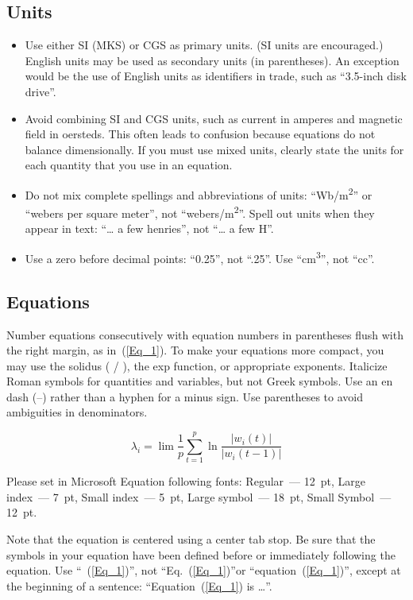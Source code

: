 \documentclass [a4paper,final,conference,10pt]{IDAACS}
\begin{document}
\subsection{Units}
\begin{itemize}
\item {Use either SI (MKS) or CGS as primary units. (SI units are 
encouraged.) English units may be used as secondary units (in parentheses).
An exception would be the use of English units as identifiers in trade, 
such as ``3.5-inch disk drive''.}
\item {Avoid combining SI and CGS units, such as current in amperes and 
magnetic field in oersteds. This often leads to confusion because equations
do not balance dimensionally. If you must use mixed units, clearly state the
units for each quantity that you use in an equation.}
\item {Do not mix complete spellings and abbreviations of units: 
``Wb/m\textsuperscript{2}'' or ``webers per square meter'', not 
``webers/m\textsuperscript{2}''.  Spell out units when they appear in 
text: ``\ldots{} a few henries'', not ``\ldots{} a few H''.}
\item {Use a zero before decimal points: ``0.25'', not ``.25''. Use 
``cm\textsuperscript{3}'', not ``cc''.}
\end{itemize}

\subsection{Equations}

Number equations consecutively with equation numbers in parentheses flush 
with the right margin, as in~(\ref{Eq_1}). To make your equations more compact,
you may use the solidus ( / ), the exp function, or appropriate exponents. 
Italicize Roman symbols for quantities and variables, but not Greek symbols.
Use an en dash (--) rather than a hyphen for a minus sign. Use parentheses to
avoid ambiguities in denominators. 

\begin{equation}
\label{Eq_1}
\lambda_i = \lim \frac{1}{p} \sum_{t=1}^p \ln \frac{|w_i (t)|}{|w_i (t-1)|}
\end{equation}

Please set in Microsoft Equation following fonts: Regular~--- 12~pt, Large 
index~--- 7~pt, Small index~--- 5~pt, Large symbol~--- 18~pt, Small 
Symbol~--- 12~pt.

Note that the equation is centered using a center tab stop. Be sure that the
symbols in your equation have been defined before or immediately following 
the equation. Use ``~(\ref{Eq_1})'', not ``Eq.~(\ref{Eq_1})''or 
``equation~(\ref{Eq_1})'', except at the beginning of a sentence: 
``Equation~(\ref{Eq_1}) is \ldots{}''.
\end{document}
